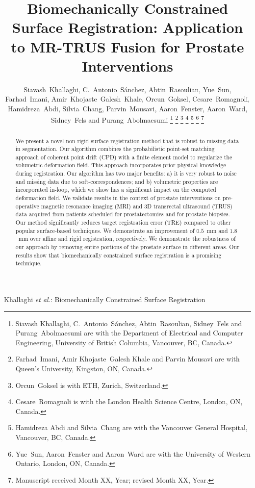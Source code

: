 \documentclass[journal]{IEEEtran}
\begin{document}
\title{Biomechanically Constrained Surface Registration: Application to MR-TRUS Fusion for Prostate Interventions}

\author{Siavash~Khallaghi, C.~Antonio~S\'anchez, Abtin~Rasoulian, Yue~Sun, Farhad~Imani, Amir~Khojaste~Galesh~Khale, Orcun~Goksel, Cesare~Romagnoli, Hamidreza~Abdi, Silvia~Chang, Parvin~Mousavi, Aaron~Fenster, Aaron~Ward, Sidney~Fels and Purang~Abolmaesumi%
\thanks{Siavash Khallaghi, C.~Antonio~S\'anchez, Abtin~Rasoulian, Sidney~Fels and Purang~Abolmaesumi are with the Department of Electrical and Computer Engineering, University of British Columbia, Vancouver, BC, Canada.}%
\thanks{Farhad~Imani, Amir Khojaste~Galesh Khale and Parvin Mousavi are with Queen's University, Kingston, ON, Canada.}
\thanks{Orcun~Goksel is with ETH, Zurich, Switzerland.}
\thanks{Cesare~Romagnoli is with the London Health Science Centre, London, ON, Canada.}%
\thanks{Hamidreza Abdi and Silvia~Chang are with the Vancouver General Hospital, Vancouver, BC, Canada.}%
\thanks{Yue~Sun, Aaron~Fenster and Aaron~Ward are with the University of Western Ontario, London, ON, Canada.}%
\thanks{Manuscript received Month XX, Year; revised Month XX, Year.}}

%
{Khallaghi \MakeLowercase{\textit{et al.}}: Biomechanically Constrained Surface Registration}

\maketitle

\begin{abstract}
We present a novel non-rigid surface registration method that is robust to missing data in segmentation. Our algorithm combines the probabilistic point-set matching approach of coherent point drift (CPD) with a finite element model to regularize the volumetric deformation field. This approach incorporates prior physical knowledge during registration. Our algorithm has two major benefits: a) it is very robust to noise and missing data due to soft-correspondences; and b) volumetric properties are incorporated in-loop, which we show has a significant impact on the computed deformation field. We validate results in the context of prostate interventions on pre-operative magnetic resonance imaging (MRI) and 3D transrectal ultrasound (TRUS) data acquired from patients scheduled for prostatectomies and for prostate biopsies. Our method significantly reduces target registration error (TRE) compared to other popular surface-based techniques. We demonstrate an improvement of $0.5$~mm and $1.8$~mm over affine and rigid registration, respectively. We demonstrate the robustness of our approach by removing entire portions of the prostate surface in different areas. Our results show that biomechanically constrained surface registration is a promising technique.
\end{abstract}
\end{document}
